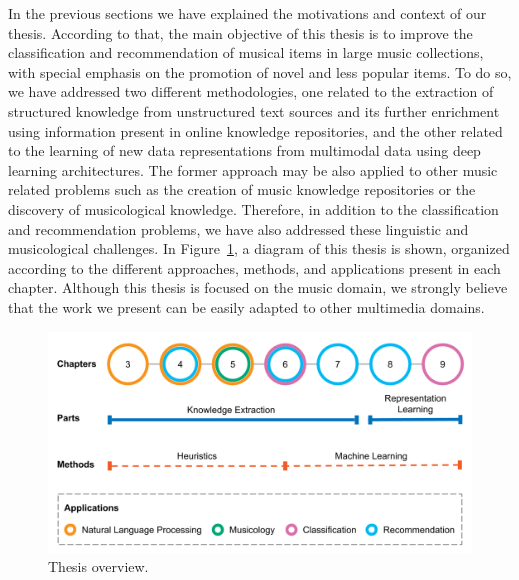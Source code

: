 In the previous sections we have explained the motivations and context of our thesis. According to that, the main objective of this thesis is to improve the classification and recommendation of musical items in large music collections, with special emphasis on the promotion of novel and less popular items. To do so, we have addressed two different methodologies, one related to the extraction of structured knowledge from unstructured text sources and its further enrichment using information present in online knowledge repositories, and the other related to the learning of new data representations from multimodal data using deep learning architectures. The former approach may be also applied to other music related problems such as the creation of music knowledge repositories or the discovery of musicological knowledge. %
Therefore, in addition to the classification and recommendation problems, we have also addressed these linguistic and musicological challenges.
In Figure~\ref{fig:intro:chapters}, a diagram of this thesis is shown, organized according to the different approaches, methods, and applications present in each chapter. Although this thesis is focused on the music domain, we strongly believe that the work we present can be easily adapted to other multimedia domains. 

\begin{figure}
	\centering
	\includegraphics[width=\textwidth]{ch01_introduction_pics/Thesis_schema.png}
	\caption{Thesis overview.\label{fig:intro:chapters}}
\end{figure}


